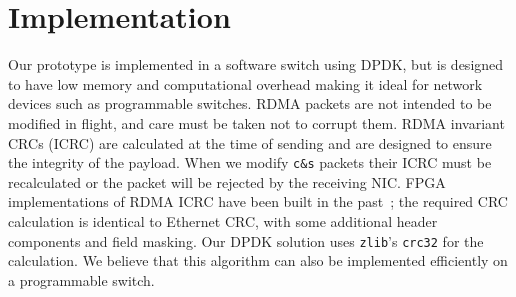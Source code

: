 \section{Implementation}

Our prototype is implemented in a software switch using DPDK, but is designed to
have low memory and computational overhead making it ideal for network devices
such as programmable switches.  RDMA packets are not intended to be modified in
flight, and care must be taken not to corrupt them. RDMA invariant CRCs (ICRC)
are calculated at the time of sending and are designed to ensure the integrity
of the payload. When we modify \texttt{c\&s} packets their ICRC must be
recalculated or the packet will be rejected by the receiving NIC. FPGA
implementations of RDMA ICRC have been built in the past~\cite{Mansour_2019};
the required CRC calculation is identical to Ethernet CRC, with some additional
header components and field masking.  Our DPDK solution uses \texttt{zlib}'s
\texttt{crc32} for the calculation.  We believe that this algorithm can also be
implemented efficiently on a programmable switch.
